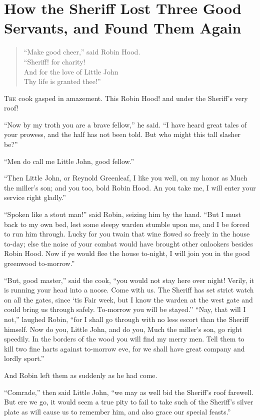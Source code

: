 \chapter{How the Sheriff Lost Three Good Servants, and Found Them Again}

\begin{quote}
“Make good cheer,” said Robin Hood.\\
“Sheriff! for charity!\\
And for the love of Little John\\
Thy life is granted thee!”
\end{quote}

\lettrine{T}{he} cook gasped in amazement. This Robin Hood! and under the Sheriff's
very roof!

``Now by my troth you are a brave fellow,'' he said. ``I have heard
great tales of your prowess, and the half has not been told. But who
might this tall slasher be?''

``Men do call me Little John, good fellow.''

``Then Little John, or Reynold Greenleaf, I like you well, on my honor
as Much the miller's son; and you too, bold Robin Hood. An you take me,
I will enter your service right gladly.''

``Spoken like a stout man!'' said Robin, seizing him by the hand. ``But
I must back to my own bed, lest some sleepy warden stumble upon me, and
I be forced to run him through. Lucky for you twain that wine flowed so
freely in the house to-day; else the noise of your combat would have
brought other onlookers besides Robin Hood. Now if ye would flee the
house to-night, I will join you in the good greenwood to-morrow.''

``But, good master,'' said the cook, ``you would not stay here over
night! Verily, it is running your head into a noose. Come with us. The
Sheriff has set strict watch on all the gates, since `tis Fair week, but
I know the warden at the west gate and could bring us through safely.
To-morrow you will be stayed.'' ``Nay, that will I not,'' laughed Robin,
``for I shall go through with no less escort than the Sheriff himself.
Now do you, Little John, and do you, Much the miller's son, go right
speedily. In the borders of the wood you will find my merry men. Tell
them to kill two fine harts against to-morrow eve, for we shall have
great company and lordly sport.''

And Robin left them as suddenly as he had come.

``Comrade,'' then said Little John, ``we may as well bid the Sheriff's
roof farewell. But ere we go, it would seem a true pity to fail to take
such of the Sheriff's silver plate as will cause us to remember him, and
also grace our special feasts.''

